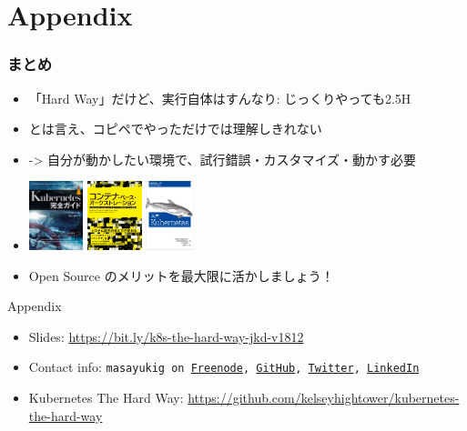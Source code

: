 \documentclass[aspectratio=169,11pt,hyperref={colorlinks=true}]{beamer}
\begin{document}
\section{Appendix}
\begin{frame}
  \frametitle{まとめ}
  \begin{itemize}
    \item 「Hard Way」だけど、実行自体はすんなり: じっくりやっても2.5H
    \item とは言え、コピペでやっただけでは理解しきれない
    \item[] -> 自分が動かしたい環境で、試行錯誤・カスタマイズ・動かす必要
    \item[] \includegraphics[height=20mm]{images/kubernetes_complete_guide.jpg}
       \includegraphics[height=20mm]{images/container_based_orchestration.jpg}
       \includegraphics[height=20mm]{images/kubernetes_up_and_running.jpeg}
    \item Open Source のメリットを最大限に活かしましょう！
  \end{itemize}
  Appendix
  \begin{itemize}
      \item Slides: \url{https://bit.ly/k8s-the-hard-way-jkd-v1812}
      \item Contact info: \texttt{masayukig on
        \href{https://freenode.net/}{Freenode},
        \href{https://github.com/masayukig}{GitHub},
        \href{https://twitter.com/masayukig}{Twitter},
        \href{https://www.linkedin.com/in/masayukig/}{LinkedIn}}
      \item Kubernetes The Hard Way: \url{https://github.com/kelseyhightower/kubernetes-the-hard-way}
  \end{itemize}
\end{frame}
\end{document}
